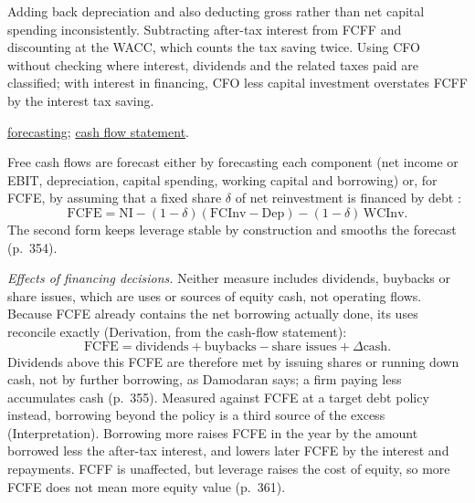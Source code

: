 \begin{qfmethod}
 Adding back depreciation and also deducting gross rather than net capital spending inconsistently. Subtracting after-tax interest from FCFF and discounting at the WACC, which counts the tax saving twice. Using CFO without checking where interest, dividends and the related taxes paid are classified; with interest in financing, CFO less capital investment overstates FCFF by the interest tax saving.

 \hyperref[meth:fcf-forecasting]{forecasting}; \hyperref[meth:cash-flow-interpretation]{cash flow statement}.

\end{qfmethod}

\begin{qfmethod}\label{meth:fcf-forecasting}
 Free cash flows are forecast either by forecasting each component (net income or EBIT, depreciation, capital spending, working capital and borrowing) or, for FCFE, by assuming that a fixed share $\delta$ of net reinvestment is financed by debt \citep[pp.~352--353]{investment-valuation-2012}:
\[ \mathrm{FCFE}=\mathrm{NI}-(1-\delta)(\mathrm{FCInv}-\mathrm{Dep})-(1-\delta)\,\mathrm{WCInv}. \]
The second form keeps leverage stable by construction and smooths the forecast (p.~354).

\emph{Effects of financing decisions.} Neither measure includes dividends, buybacks or share issues, which are uses or sources of equity cash, not operating flows. Because FCFE already contains the net borrowing actually done, its uses reconcile exactly (Derivation, from the cash-flow statement):
\[ \mathrm{FCFE}=\text{dividends}+\text{buybacks}-\text{share issues}+\Delta\text{cash}. \]
Dividends above this FCFE are therefore met by issuing shares or running down cash, not by further borrowing, as Damodaran says; a firm paying less accumulates cash (p.~355). Measured against FCFE at a target debt policy instead, borrowing beyond the policy is a third source of the excess (Interpretation). Borrowing more raises FCFE in the year by the amount borrowed less the after-tax interest, and lowers later FCFE by the interest and repayments. FCFF is unaffected, but leverage raises the cost of equity, so more FCFE does not mean more equity value (p.~361).


\end{qfmethod}

